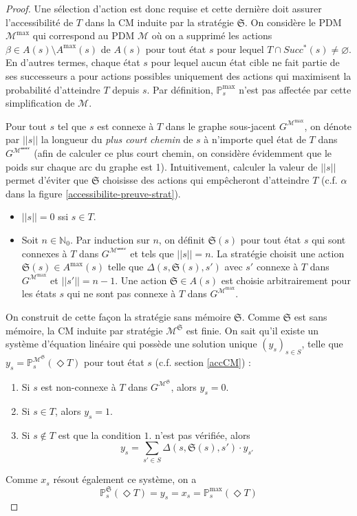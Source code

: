 \documentclass[12pt,a4paper]{report}
\theoremstyle{definition}%
\theoremstyle{remark}
\newcommand{\pr}{\mathbb{P}}
\let\labelitemi\labelitemii
\begin{document}
\begin{proof}
	Une sélection d'action est donc requise et cette dernière doit assurer
	l'accessibilité de $T$ dans la
	CM induite par la stratégie $\mathfrak{S}$.
	On considère le PDM $\mathcal{M}^{\max}$ qui correspond au PDM $\mathcal{M}$
	où on a supprimé les actions $\beta \in A(s) \setminus A^{\max}(s)$ de $A(s)$
	pour tout état $s$ pour lequel $T \cap Succ^*(s) \neq \varnothing$. En d'autres
	termes, chaque état $s$ pour lequel aucun état cible ne fait partie de ses
	successeurs a pour actions possibles uniquement des actions qui maximisent
	la probabilité d'atteindre $T$ depuis $s$.
	Par définition, $\pr^{\max}_s$ n'est pas affectée par cette simplification de
	$\mathcal{M}$. \par
	Pour tout $s$ tel que $s$ est connexe à $T$ dans le graphe sous-jacent
	$G^{\mathcal{M}^{\max}}$, on dénote par $||s||$ la longueur du \textit{plus
	court chemin} de $s$ à n'importe quel état de $T$ dans
	$G^\mathcal{M^{\max}}$ (afin de calculer ce plus court chemin,
	on considère évidemment que le poids sur chaque arc du graphe est 1).
	Intuitivement, calculer la valeur de $||s||$ permet d'éviter que $\mathfrak{S}$ choisisse des
	actions qui empêcheront d'atteindre $T$ (c.f. $\alpha$ dans la figure
	\ref{accessibilite-preuve-strat}).
	\begin{itemize}
		\renewcommand{\labelitemi}{\tiny$\bullet$}
		\item $||s|| = 0$ ssi $s \in T$.
		\item Soit $n \in \mathbb{N}_0$. Par induction sur $n$, on définit
			$\mathfrak{S}(s)$ pour tout état $s$ qui sont connexes à $T$ dans
			$G^{\mathcal{M^{\max}}}$ et tels que $||s|| = n$.
			La stratégie choisit une action $\mathfrak{S}(s) \in A^{\max}(s)$ telle
			que $\Delta(s, \mathfrak{S}(s), s')$ avec $s'$ connexe à $T$ dans
			$G^{\mathcal{M}^{\max}}$ et $||s'|| = n - 1$. Une action $\mathfrak{S} \in A(s)$ est choisie
			arbitrairement pour les états $s$ qui ne sont
			pas connexe à $T$ dans $G^{\mathcal{M}^{\max}}$.
	\end{itemize}
	On construit de cette façon la stratégie sans mémoire $\mathfrak{S}$.
	Comme $\mathfrak{S}$ est sans mémoire, la CM induite par stratégie
	$\mathcal{M}^\mathfrak{S}$ est finie.
	On sait qu'il existe un système d'équation linéaire qui possède une solution
	unique $(y_s)_{s \in S}$, telle que $y_s = \pr^{\mathcal{M}^\mathfrak{S}}_s(\Diamond T)$  pour tout état $s$ (c.f. section \ref{accCM}) :
	\begin{enumerate}
		\item Si $s$ est non-connexe à $T$ dans $G^{\mathcal{M}^\mathfrak{S}}$,
			alors $y_s = 0$.
		\item Si $s \in T$, alors $y_s = 1$.
		\item Si $s \not\in T$ est que la condition $1.$ n'est pas vérifiée, alors
			\[y_s = \sum_{s' \in S} \Delta(s, \mathfrak{S}(s), s') \cdot y_{s'}\]
	\end{enumerate}
	Comme $x_s$ résout également ce système, on a
	\[
		\pr^\mathfrak{S}_s(\Diamond T) = y_s = x_s = \pr^{\max}_s (\Diamond T)
	\]
\end{proof}
\end{document}
